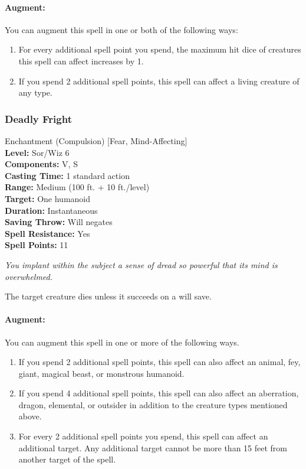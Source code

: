 \paragraph{Augment:} You can augment this spell in one or both of the following ways:
\begin{enumerate}
\item For every additional spell point you spend, the maximum hit dice of creatures this spell can affect increases by 1.
\item If you spend 2 additional spell points, this spell can affect a living creature of any type.
\end{enumerate}
\subsubsection{Deadly Fright}
\label{Spell:DeadlyFright}
Enchantment (Compulsion) [Fear, Mind-Affecting]
\\ \textbf{Level:} Sor/Wiz 6
\\ \textbf{Components:} V, S
\\ \textbf{Casting Time:} 1 standard action
\\ \textbf{Range:} Medium (100 ft. + 10 ft./level)
\\ \textbf{Target:} One humanoid
\\ \textbf{Duration:} Instantaneous
\\ \textbf{Saving Throw:} Will negates
\\ \textbf{Spell Resistance:} Yes
\\ \textbf{Spell Points:} 11

\emph{You implant within the subject a sense of dread so powerful that its mind is overwhelmed.}

The target creature dies unless it succeeds on a will save.

\paragraph{Augment:} You can augment this spell in one or more of the following ways.
\begin{enumerate}
 \item If you spend 2 additional spell points, this spell can also affect an animal, fey, giant, magical beast, or monstrous humanoid.
 \item If you spend 4 additional spell points, this spell can also affect an aberration, 
 dragon, elemental, or outsider in addition to the creature types mentioned above.
 \item For every 2 additional spell points you spend, this spell can affect an additional target. 
 Any additional target cannot be more than 15 feet from another target of the spell.
\end{enumerate}

